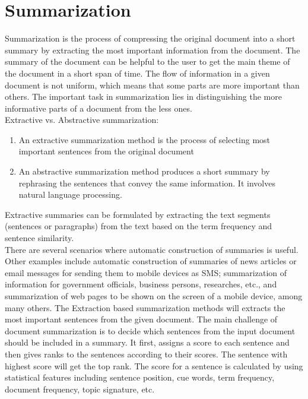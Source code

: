 \section{Summarization}
Summarization \cite{reddy2012efficient} is the process of compressing the original document into a short summary by extracting the most important information from the document. The summary of the document can be helpful to the user to get the main theme of the document in a short span of time. The flow of information in a given document is not uniform, which means that some parts are more important than others. The important task in summarization lies in distinguishing the more informative parts of a document from the less ones.\\
Extractive vs. Abstractive summarization: 
\begin{enumerate}
    \item An extractive summarization method is the process of selecting most important sentences from the original document
    \item An abstractive summarization method produces a short summary by rephrasing the sentences that convey the same information. It involves natural language processing.\\ 
\end{enumerate}
Extractive summaries \cite{madhuri2019extractive} can be formulated by extracting the text segments (sentences or paragraphs) from the text based on the term frequency and sentence similarity. \\
There are several scenarios where automatic construction of summaries is useful. Other examples include automatic construction of summaries of news articles or email messages for sending them to mobile devices as SMS; summarization of information for government officials, business persons, researches, etc., and summarization of web pages to be shown on the screen of a mobile device, among many others. The Extraction based summarization methods will extracts the most important sentences from the given document. The main challenge of document summarization is to decide which sentences from the input document should be included in a summary. It first, assigns a score to each sentence and then gives ranks to the sentences according to their scores. The sentence with highest score will get the top rank. The score for a sentence is calculated by using statistical features including sentence position, cue words, term frequency, document frequency, topic signature, etc. \\
